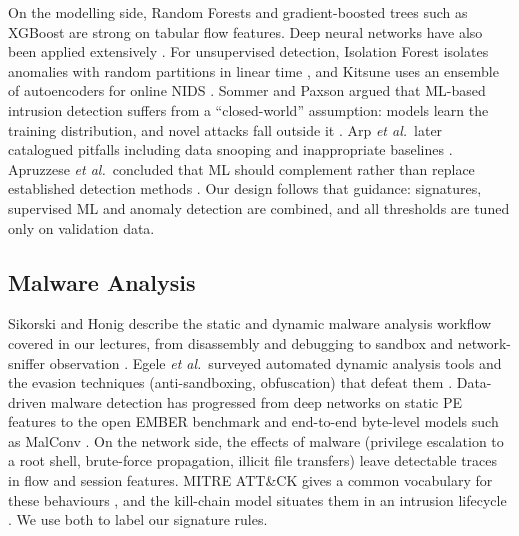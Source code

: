 \documentclass[12pt,a4paper,oneside]{article}
\begin{document}
On the modelling side, Random Forests \cite{breiman2001random} and gradient-boosted trees such as XGBoost \cite{chen2016xgboost} are strong on tabular flow features. Deep neural networks have also been applied extensively \cite{vinayakumar2019deep}. For unsupervised detection, Isolation Forest isolates anomalies with random partitions in linear time \cite{liu2008isolation}, and Kitsune uses an ensemble of autoencoders for online NIDS \cite{mirsky2018kitsune}. Sommer and Paxson argued that ML-based intrusion detection suffers from a ``closed-world'' assumption: models learn the training distribution, and novel attacks fall outside it \cite{sommer2010outside}. Arp \emph{et al.}\ later catalogued pitfalls including data snooping and inappropriate baselines \cite{arp2022dos}. Apruzzese \emph{et al.}\ concluded that ML should complement rather than replace established detection methods \cite{apruzzese2023role}. Our design follows that guidance: signatures, supervised ML and anomaly detection are combined, and all thresholds are tuned only on validation data.

\subsection{Malware Analysis}
Sikorski and Honig describe the static and dynamic malware analysis workflow covered in our lectures, from disassembly and debugging to sandbox and network-sniffer observation \cite{sikorski2012practical}. Egele \emph{et al.}\ surveyed automated dynamic analysis tools and the evasion techniques (anti-sandboxing, obfuscation) that defeat them \cite{egele2012survey}. Data-driven malware detection has progressed from deep networks on static PE features \cite{saxe2015deep} to the open EMBER benchmark \cite{anderson2018ember} and end-to-end byte-level models such as MalConv \cite{raff2018malware}. On the network side, the effects of malware (privilege escalation to a root shell, brute-force propagation, illicit file transfers) leave detectable traces in flow and session features. MITRE ATT\&CK gives a common vocabulary for these behaviours \cite{strom2018mitre}, and the kill-chain model situates them in an intrusion lifecycle \cite{hutchins2011intelligence}. We use both to label our signature rules.
\end{document}
